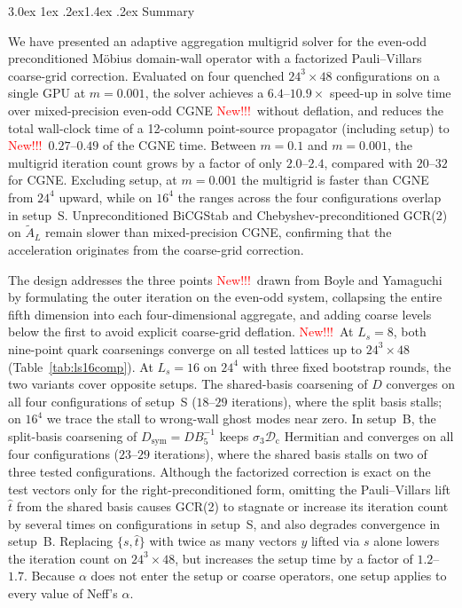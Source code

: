 \documentclass[11pt,a4paper]{article}
\makeatletter
\newif\ifshownew \shownewtrue
\DeclareRobustCommand\New{\ifshownew\textcolor{red}{New!!!}\ \else\ignorespaces\fi}
\renewcommand\section{\@startsection{section}{1}{\z@}%
  {3.0ex \@plus 1ex \@minus .2ex}{1.4ex \@plus .2ex}%
  {\centering\normalfont\normalsize\bfseries}}
\newcommand\FloatBarrier{\par\begingroup\let\@elt\relax
  \edef\@tempa{\@botlist\@deferlist\@dbldeferlist}%
  \ifx\@tempa\@empty\else\clearpage\fi\endgroup}
\let\origsection\section
\renewcommand\section{\FloatBarrier\origsection}
\numberwithin{equation}{section}
\newcommand{\AL}{\tilde A_{L}}
\newcommand{\Dc}{\mathcal D_{\mathrm c}}
\newcommand{\Dsym}{D_{\mathrm{sym}}}
\newif\ifresults
\makeatother
\begin{document}
\fi


\ifresults


\section{Summary}
\label{sec:summary}

We have presented an adaptive aggregation multigrid solver for the even-odd preconditioned
M\"obius domain-wall operator with a factorized Pauli--Villars coarse-grid correction. Evaluated on
four quenched $24^3\times48$ configurations on a single GPU at $m=0.001$, the solver achieves a
$6.4$--$10.9\times$ speed-up in solve time over mixed-precision even-odd CGNE
\New without deflation, and reduces the total wall-clock time of a 12-column
point-source propagator (including setup) to \New $0.27$--$0.49$ of the CGNE
time. Between $m=0.1$ and $m=0.001$, the multigrid iteration count grows by a factor of only
$2.0$--$2.4$, compared with $20$--$32$ for CGNE. Excluding setup, at $m=0.001$ the multigrid is
faster than CGNE from $24^4$ upward, while on $16^4$ the ranges across the four configurations
overlap in setup~S. Unpreconditioned BiCGStab and Chebyshev-preconditioned GCR(2) on
$\AL$ remain slower than mixed-precision CGNE, confirming that the acceleration originates from the
coarse-grid correction.

The design addresses the three points \New drawn from Boyle and Yamaguchi~\cite{BY} by
formulating the outer iteration on the even-odd system, collapsing the entire fifth dimension into
each four-dimensional aggregate, and adding coarse levels below the first to avoid explicit
coarse-grid deflation. \New At $L_s=8$, both nine-point quark coarsenings converge on all tested
lattices up to $24^3\times48$ (Table~\ref{tab:ls16comp}). At $L_s=16$ on $24^4$ with three fixed
bootstrap rounds, the two variants cover opposite setups. The shared-basis coarsening of $D$
converges on all four configurations of setup~S ($18$--$29$ iterations), where the split basis
stalls; on $16^4$ we trace the stall to wrong-wall ghost modes near zero. In setup~B, the split-basis coarsening of
$\Dsym=DB_5^{-1}$ keeps $\sigma_3\Dc$ Hermitian and converges on all four configurations
($23$--$29$ iterations), where the shared basis stalls on two of three tested configurations.
Although the factorized correction is exact on the test vectors only for the
right-preconditioned form, omitting the Pauli--Villars lift $\hat t$ from the shared basis causes
GCR(2) to stagnate or increase its iteration count by several times on configurations in setup~S,
and also degrades convergence in setup~B. Replacing $\{s,\hat t\}$ with twice as many vectors $y$
lifted via $s$ alone lowers the iteration count on $24^3\times48$, but increases the setup time by
a factor of $1.2$--$1.7$. Because $\alpha$ does not enter the setup or coarse operators, one setup
applies to every value of Neff's $\alpha$.
\end{document}
